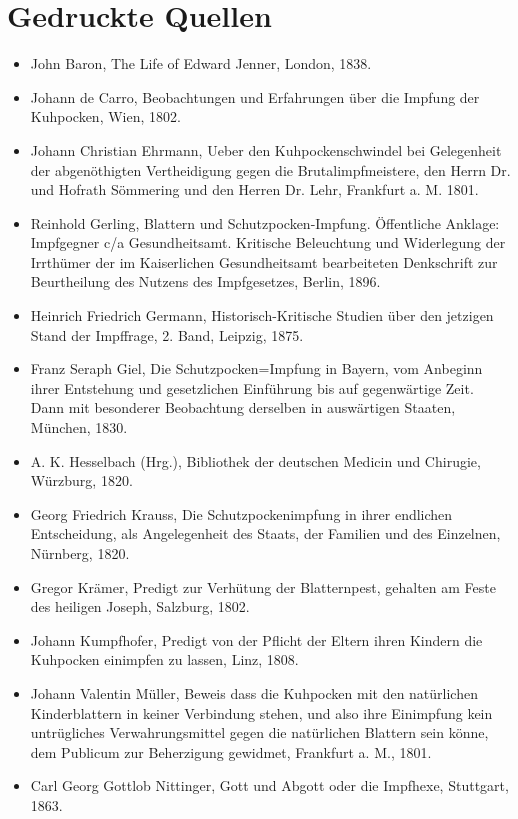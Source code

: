 \documentclass[
    a4paper,
    12pt,
    hyphens,
    chapterprefix=true,
    headheight=33pt,
    footheight=29pt,
    headings=optiontohead, %
]{scrartcl}
\begin{document}
{\section{Gedruckte Quellen}

\begin{itemize}
\item{John Baron, The Life of Edward Jenner, London, 1838.}
\item{Johann de Carro, Beobachtungen und Erfahrungen über die Impfung der Kuhpocken, Wien, 1802.}
\item{Johann Christian Ehrmann, Ueber den Kuhpockenschwindel bei Gelegenheit der abgenöthigten Vertheidigung gegen die Brutalimpfmeistere, den Herrn Dr. und Hofrath Sömmering und den Herren Dr. Lehr, Frankfurt a. M. 1801.}
\item{Reinhold Gerling, Blattern und Schutzpocken-Impfung. Öffentliche Anklage: Impfgegner c/a Gesundheitsamt. Kritische  Beleuchtung  und  Widerlegung  der  Irrthümer der  im  Kaiserlichen  Gesundheitsamt  bearbeiteten  Denkschrift  zur Beurtheilung  des  Nutzens  des  Impfgesetzes, Berlin, 1896.}
\item{Heinrich Friedrich Germann, Historisch-Kritische Studien über den jetzigen Stand der Impffrage, 2. Band, Leipzig, 1875.}
\item{Franz Seraph Giel, Die Schutzpocken=Impfung in Bayern, vom Anbeginn ihrer Entstehung und gesetzlichen Einführung  bis auf gegenwärtige Zeit. Dann mit besonderer Beobachtung derselben in auswärtigen Staaten, München, 1830.}
\item{A. K. Hesselbach (Hrg.), Bibliothek der deutschen Medicin und Chirugie, Würzburg, 1820.}
\item{Georg Friedrich Krauss, Die Schutzpockenimpfung in ihrer endlichen Entscheidung, als Angelegenheit des Staats, der Familien und des Einzelnen, Nürnberg, 1820.}
\item{Gregor Krämer, Predigt zur Verhütung der Blatternpest, gehalten am Feste des heiligen Joseph, Salzburg, 1802.}
\item{Johann Kumpfhofer, Predigt von der Pflicht der Eltern ihren Kindern die Kuhpocken einimpfen zu lassen, Linz, 1808.}
\item{Johann Valentin Müller, Beweis dass die Kuhpocken mit den natürlichen Kinderblattern in keiner Verbindung stehen, und also ihre Einimpfung kein untrügliches Verwahrungsmittel gegen die natürlichen Blattern sein könne, dem Publicum zur Beherzigung gewidmet, Frankfurt a. M., 1801.}
\item{Carl Georg Gottlob Nittinger, Gott und Abgott oder die Impfhexe, Stuttgart, 1863.}

\end{itemize}}
\end{document}
